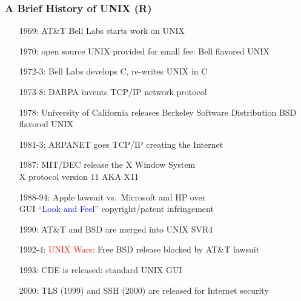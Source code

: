 \documentclass[11pt,pdftex,dvipsnames,usenames,helvetica]{beamer}
\begin{document}
\begin{frame}
\frametitle{A Brief History of UNIX (R)}
\begin{itemize}
\item[1969:] AT\&T Bell Labs starts work on UNIX
\item[1970:] open source UNIX provided for small fee: Bell flavored UNIX
\item[1972-3:] Bell Labs develops C, re-writes UNIX in C 
\item[1973-8:] DARPA invents TCP/IP network protocol 
\item[1978:] University of California releases Berkeley Software Distribution 
BSD flavored UNIX 
\item[1981-3:] ARPANET goes TCP/IP creating the Internet
\item[1987:] MIT/DEC release the X Window System\\
X protocol version 11 AKA X11
\item[1988-94:] Apple lawsuit vs.\ Microsoft and HP over\\
 GUI \textcolor{blue}{``Look and Feel''} copyright/patent infringement
\item[1990:] AT\&T and BSD are merged into UNIX SVR4 
\item[1992-4:] \textcolor{red}{UNIX Wars:} Free BSD release blocked by AT\&T lawsuit
\item[1993:] CDE is released: standard UNIX GUI 
\item[2000:] TLS (1999) and SSH (2000) are released for Internet security 
\end{itemize}
\end{frame}
\end{document}
